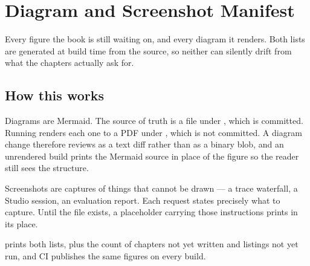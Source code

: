 \chapter{Diagram and Screenshot Manifest}
\label{app:manifest}

\noindent
Every figure the book is still waiting on, and every diagram it renders. Both
lists are generated at build time from the source, so neither can silently drift
from what the chapters actually ask for.

\section*{How this works}

Diagrams are Mermaid. The source of truth is a  file under
, which is committed. Running 
renders each one to a PDF under , which is not
committed. A diagram change therefore reviews as a text diff rather than as a
binary blob, and an unrendered build prints the Mermaid source in place of the
figure so the reader still sees the structure.

Screenshots are captures of things that cannot be drawn --- a trace waterfall, a
Studio session, an evaluation report. Each request states precisely what to
capture. Until the file exists, a placeholder carrying those instructions prints
in its place.

\medskip
\noindent
{} prints both lists, plus the count of chapters not yet written
and listings not yet run, and CI publishes the same figures on every build.

\listofdiagrams

\listofshots
